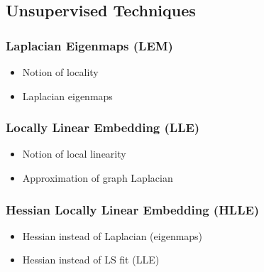 
\subsection{Unsupervised Techniques}
\label{techniques}


\subsubsection{Laplacian Eigenmaps (LEM)}
\label{laplace}

\begin{itemize}
  \item Notion of locality
  \item Laplacian eigenmaps
\end{itemize}


\subsubsection{Locally Linear Embedding (LLE)}
\label{lle}

\begin{itemize}
  \item Notion of local linearity
  \item Approximation of graph Laplacian
\end{itemize}



\subsubsection{Hessian Locally Linear Embedding (HLLE)}
\label{hlle}

\begin{itemize}
  \item Hessian instead of Laplacian (eigenmaps)
  \item Hessian instead of LS fit (LLE)
\end{itemize}
